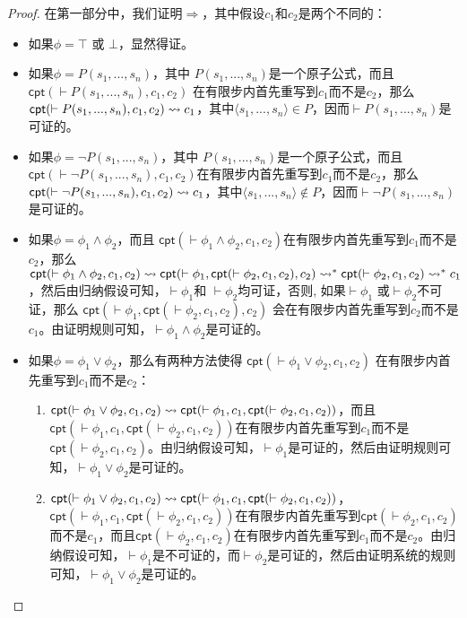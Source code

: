 \begin{proof}
	在第一部分中，我们证明$\Rightarrow$，其中假设$c_1$和$c_2$是两个不同的\CPT：
	\begin{itemize}
		\item 如果$\phi=\top$ 或 $\bot$，显然得证。
		\item 如果$\phi=P(s_1,...,s_n)$，其中 $P(s_1,...,s_n)$是一个原子公式，而且\\$\textsf{cpt}(\vdash P(s_1,...,s_n), c_1, c_2)$ 在有限步内首先重写到$c_1$而不是$c_2$，那么 $\textsf{cpt}(\vdash P(s_1,...,s_n), c_1, c_2)\rightsquigarrow c_1$，其中$\langle s_1,...,s_n\rangle\in P$，因而$\vdash P(s_1,...,s_n)$是可证的。
		\item 如果$\phi=\neg P(s_1,...,s_n)$，其中 $P(s_1,...,s_n)$是一个原子公式，而且\\$\textsf{cpt}(\vdash \neg P(s_1,...,s_n),c_1,c_2)$在有限步内首先重写到$c_1$而不是$c_2$，那么 $\textsf{cpt}(\vdash \neg P(s_1,...,s_n), c_1, c_2)\rightsquigarrow c_1$，其中$\langle s_1,...,s_n\rangle \notin P$，因而$\vdash \neg P(s_1,...,s_n)$是可证的。
		\item 如果$\phi=\phi_1\wedge\phi_2$，而且 $\textsf{cpt}(\vdash\phi_1\wedge\phi_2,c_1,c_2)$在有限步内首先重写到$c_1$而不是$c_2$，那么 $\textsf{cpt}(\vdash\phi_1\wedge\phi_2,c_1,c_2)\rightsquigarrow\textsf{cpt}(\vdash \phi_1, \textsf{cpt}(\vdash\phi_2,c_1,c_2), c_2)\rightsquigarrow^*\textsf{cpt}(\vdash\phi_2,c_1,c_2)\rightsquigarrow^*c_1$，然后由归纳假设可知，$\vdash\phi_1$和 $\vdash\phi_2$均可证，否则, 如果$\vdash\phi_1$ 或$\vdash\phi_2$不可证，那么 $\textsf{cpt}(\vdash \phi_1, \textsf{cpt}(\vdash\phi_2,c_1,c_2), c_2)$ 会在有限步内首先重写到$c_2$而不是$c_1$。由证明规则可知，$\vdash\phi_1\wedge\phi_2$是可证的。
		\item 如果$\phi = \phi_1\vee\phi_2$，那么有两种方法使得 $\textsf{cpt}(\vdash\phi_1\vee\phi_2,c_1,c_2)$ 在有限步内首先重写到$c_1$而不是$c_2$：
		\begin{enumerate}
			\item $\textsf{cpt}(\vdash\phi_1\vee\phi_2,c_1,c_2)\rightsquigarrow\textsf{cpt}(\vdash\phi_1,c_1,\textsf{cpt}(\vdash\phi_2,c_1,c_2))$，而且 $\textsf{cpt}(\vdash\phi_1,c_1,\textsf{cpt}(\vdash\phi_2,c_1,c_2))$在有限步内首先重写到$c_1$而不是 $\textsf{cpt}(\vdash\phi_2,c_1,c_2)$。由归纳假设可知，$\vdash\phi_1$是可证的，然后由证明规则可知，$\vdash\phi_1\vee\phi_2$是可证的。
			\item $\textsf{cpt}(\vdash\phi_1\vee\phi_2,c_1,c_2)\rightsquigarrow\textsf{cpt}(\vdash\phi_1,c_1,\textsf{cpt}(\vdash\phi_2,c_1,c_2))$， $\textsf{cpt}(\vdash\phi_1,c_1,\textsf{cpt}(\vdash\phi_2,c_1,c_2))$在有限步内首先重写到$\textsf{cpt}(\vdash\phi_2,c_1,c_2)$ 而不是$c_1$，而且$\textsf{cpt}(\vdash\phi_2,c_1,c_2)$在有限步内首先重写到$c_1$而不是$c_2$。由归纳假设可知，$\vdash\phi_1$是不可证的，而$\vdash\phi_2$是可证的，然后由证明系统的规则可知，$\vdash\phi_1\vee\phi_2$是可证的。
		\end{enumerate}
		

\end{itemize}
\end{proof}
